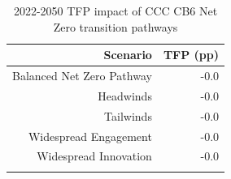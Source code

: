 \begin{longtable}{rr}
\caption{2022-2050 TFP impact of CCC CB6 Net Zero transition pathways} \\ 
  \hline
Scenario & TFP (pp) \\ 
  \hline
Balanced Net Zero Pathway & -0.0 \\ 
  Headwinds & -0.0 \\ 
  Tailwinds & -0.0 \\ 
  Widespread Engagement & -0.0 \\ 
  Widespread Innovation & -0.0 \\ 
   \hline
\hline
\label{tab_scenario_2050TFP}
\end{longtable}
